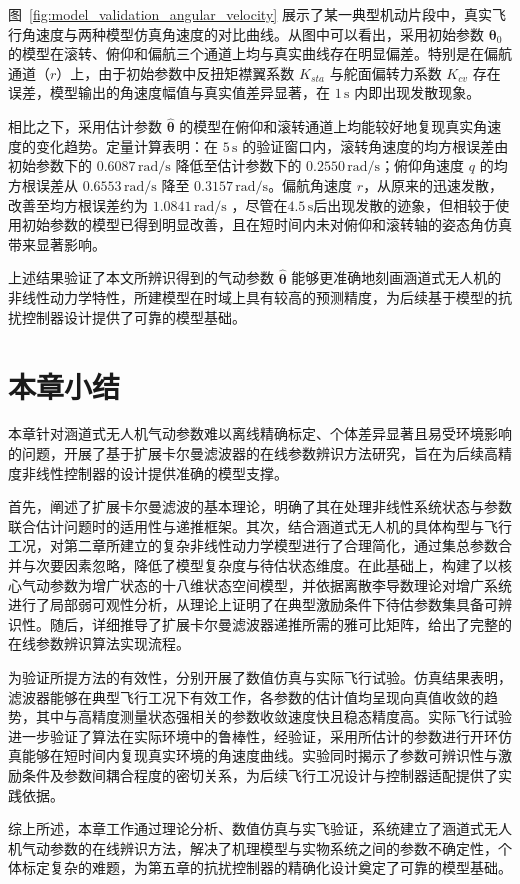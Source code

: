 图~\ref{fig:model_validation_angular_velocity} 展示了某一典型机动片段中，真实飞行角速度与两种模型仿真角速度的对比曲线。从图中可以看出，采用初始参数 \(\boldsymbol{\theta}_0\) 的模型在滚转、俯仰和偏航三个通道上均与真实曲线存在明显偏差。特别是在偏航通道（\(r\)）上，由于初始参数中反扭矩襟翼系数 \(K_{sta}\) 与舵面偏转力系数 \(K_{cv}\) 存在误差，模型输出的角速度幅值与真实值差异显著，在 \(1\,\mathrm{s}\) 内即出现发散现象。

相比之下，采用估计参数 \(\hat{\boldsymbol{\theta}}\) 的模型在俯仰和滚转通道上均能较好地复现真实角速度的变化趋势。定量计算表明：在 \(5\,\mathrm{s}\) 的验证窗口内，滚转角速度的均方根误差由初始参数下的 \(0.6087\,\mathrm{rad/s}\) 降低至估计参数下的 \(0.2550\,\mathrm{rad/s}\)；俯仰角速度 \(q\) 的均方根误差从 \(0.6553\,\mathrm{rad/s}\) 降至 \(0.3157\,\mathrm{rad/s}\)。偏航角速度 \(r\)，从原来的迅速发散，改善至均方根误差约为 \(1.0841\,\mathrm{rad/s}\) ，尽管在\(4.5\,\mathrm{s}\)后出现发散的迹象，但相较于使用初始参数的模型已得到明显改善，且在短时间内未对俯仰和滚转轴的姿态角仿真带来显著影响。

上述结果验证了本文所辨识得到的气动参数 \(\hat{\boldsymbol{\theta}}\) 能够更准确地刻画涵道式无人机的非线性动力学特性，所建模型在时域上具有较高的预测精度，为后续基于模型的抗扰控制器设计提供了可靠的模型基础。

\section{本章小结}%
本章针对涵道式无人机气动参数难以离线精确标定、个体差异显著且易受环境影响的问题，开展了基于扩展卡尔曼滤波器的在线参数辨识方法研究，旨在为后续高精度非线性控制器的设计提供准确的模型支撑。

首先，阐述了扩展卡尔曼滤波的基本理论，明确了其在处理非线性系统状态与参数联合估计问题时的适用性与递推框架。其次，结合涵道式无人机的具体构型与飞行工况，对第二章所建立的复杂非线性动力学模型进行了合理简化，通过集总参数合并与次要因素忽略，降低了模型复杂度与待估状态维度。在此基础上，构建了以核心气动参数为增广状态的十八维状态空间模型，并依据离散李导数理论对增广系统进行了局部弱可观性分析，从理论上证明了在典型激励条件下待估参数集具备可辨识性。随后，详细推导了扩展卡尔曼滤波器递推所需的雅可比矩阵，给出了完整的在线参数辨识算法实现流程。

为验证所提方法的有效性，分别开展了数值仿真与实际飞行试验。仿真结果表明，滤波器能够在典型飞行工况下有效工作，各参数的估计值均呈现向真值收敛的趋势，其中与高精度测量状态强相关的参数收敛速度快且稳态精度高。实际飞行试验进一步验证了算法在实际环境中的鲁棒性，经验证，采用所估计的参数进行开环仿真能够在短时间内复现真实环境的角速度曲线。实验同时揭示了参数可辨识性与激励条件及参数间耦合程度的密切关系，为后续飞行工况设计与控制器适配提供了实践依据。

综上所述，本章工作通过理论分析、数值仿真与实飞验证，系统建立了涵道式无人机气动参数的在线辨识方法，解决了机理模型与实物系统之间的参数不确定性，个体标定复杂的难题，为第五章的抗扰控制器的精确化设计奠定了可靠的模型基础。